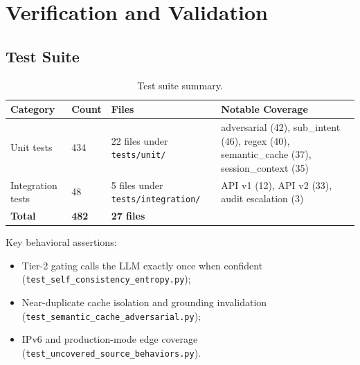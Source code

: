 \documentclass[10pt,journal,onecolumn]{IEEEtran}
\begin{document}
\section{Verification and Validation}

\subsection{Test Suite}
\begin{table}[t]
\caption{Test suite summary.}
\label{tab:testsuite}
\begin{tabularx}{\textwidth}{l l p{3cm} X}
\toprule
\textbf{Category} & \textbf{Count} & \textbf{Files} & \textbf{Notable Coverage}\\
\midrule
Unit tests & 434 & 22 files under \texttt{tests/unit/} & adversarial (42), sub\_intent (46), regex (40), semantic\_cache (37), session\_context (35)\\
Integration tests & 48 & 5 files under \texttt{tests/integration/} & API v1 (12), API v2 (33), audit escalation (3)\\
\textbf{Total} & \textbf{482} & \textbf{27 files} & \\
\bottomrule
\end{tabularx}
\end{table}

Key behavioral assertions:
\begin{itemize}
\item Tier-2 gating calls the LLM exactly once when confident (\texttt{test\_self\_consistency\_entropy.py});
\item Near-duplicate cache isolation and grounding invalidation (\texttt{test\_semantic\_cache\_adversarial.py});
\item IPv6 and production-mode edge coverage (\texttt{test\_uncovered\_source\_behaviors.py}).
\end{itemize}
\end{document}
